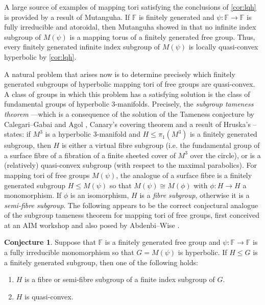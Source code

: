 \documentclass[11pt, a4paper]{amsart}
\theoremstyle{definition}
\newtheorem{conjecture}[theorem]{Conjecture}
\newcommand{\F}{\mathbb{F}}
\begin{document}
A large source of examples of mapping tori satisfying the conclusions of \cref{cor:lqh} is provided by a result of Mutanguha. If $\F$ is finitely generated and $\psi\colon \F\to \F$ is fully irreducible and atoroidal, then Mutanguha showed in \cite{Mu20} that no infinite index subgroup of $M(\psi)$ is a mapping torus of a finitely generated free group. Thus, every finitely generated infinite index subgroup of $M(\psi)$ is locally quasi-convex hyperbolic by \cref{cor:lqh}.

A natural problem that arises now is to determine precisely which finitely generated subgroups of hyperbolic mapping tori of free groups are quasi-convex. A class of groups in which this problem has a satisfying solution is the class of fundamental groups of hyperbolic 3-manifolds. Precisely, the \emph{subgroup tameness theorem} ---which is a consequence of the solution of the Tameness conjecture by Calegari--Gabai \cite{CG06} and Agol \cite{Ag04}, Canary's covering theorem \cite{Ca96} and a result of Hruska's \cite[Corollary 1.6]{Hr10}-- states: if $M^3$ is a hyperbolic 3-manifold and $H\leqslant \pi_1(M^3)$ is a finitely generated subgroup, then $H$ is either a virtual fibre subgroup (i.e. the fundamental group of a surface fibre of a fibration of a finite sheeted cover of $M^3$ over the circle), or is a (relatively) quasi-convex subgroup (with respect to the maximal parabolics). For mapping tori of free groups $M(\psi)$, the analogue of a surface fibre is a finitely generated subgroup $H\leqslant M(\psi)$ so that $M(\psi)\cong M(\phi)$ with $\phi\colon H\to H$ a monomorphism. If $\phi$ is an isomorphism, $H$ is a \emph{fibre subgroup}, otherwise it is a \emph{semi-fibre subgroup}. The following appears to be the correct conjectural analogue of the subgroup tameness theorem for mapping tori of free groups, first conceived at an AIM workshop \cite{Aim23} and also posed by Abdenbi--Wise \cite[Problem 1.5]{AW23}.

\begin{conjecture}
\label{conj}
Suppose that $\F$ is a finitely generated free group and $\psi\colon \F\to \F$ is a fully irreducible monomorphism so that $G = M(\psi)$ is hyperbolic. If $H\leqslant G$ is a finitely generated subgroup, then one of the following holds:
\begin{enumerate}
\item $H$ is a fibre or semi-fibre subgroup of a finite index subgroup of $G$.
\item $H$ is quasi-convex.
\end{enumerate}
\end{conjecture}
\end{document}
